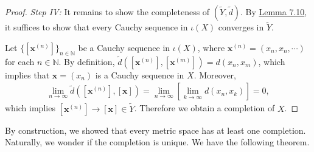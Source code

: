 \documentclass{article}
\numberwithin{equation}{section}
\theoremstyle{plain}
\theoremstyle{definition}
\begin{document}
\begin{proof}
\vspace{0.12cm}
\textit{Step IV:} It remains to show the completeness of $(\widetilde{Y},\tilde{d})$. By \hyperref[lemma:7.10]{Lemma 7.10}, it suffices to show that every Cauchy sequence in $\iota(X)$ converges in $\widetilde{Y}$.

Let $\{[\mathbf{x}^{(n)}]\}_{n\in\mathbb{N}}$ be a Cauchy sequence in $\iota(X)$, where $\mathbf{x}^{(n)}=(x_n,x_n,\cdots)$ for each $n\in\mathbb{N}$. By definition, $\tilde{d}([\mathbf{x}^{(n)}],[\mathbf{x}^{(m)}]) = d(x_n,x_m)$, which implies that $\mathbf{x}=(x_n)$ is a Cauchy sequence in $X$. Moreover,
\begin{align*}
	\lim_{n\to\infty}\tilde{d}\left([\mathbf{x}^{(n)}],[\mathbf{x}]\right) = \lim_{n\to\infty}\left[\lim_{k\to\infty} d(x_n,x_k)\right] = 0,
\end{align*}
which implies $[\mathbf{x}^{(n)}]\to[\mathbf{x}]\in\widetilde{Y}$. Therefore we obtain a completion of $X$.
\end{proof}

By construction, we showed that every metric space has at least one completion. Naturally, we wonder if the completion is unique. We have the following theorem.
\end{document}
